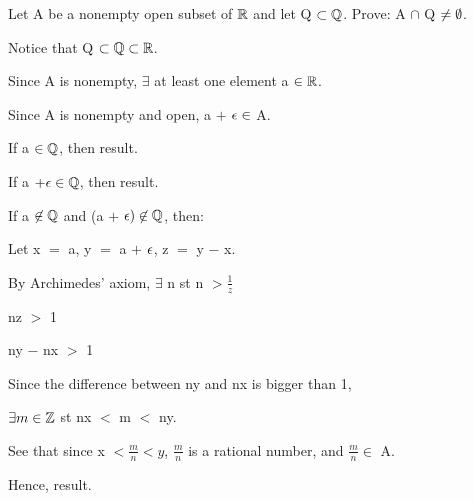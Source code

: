 \documentclass{article}
\begin{document}
\epf

\pagebreak

 Let A be a nonempty open subset of $\mathbb{R}$ and let Q $\subset \mathbb{Q}$. Prove: A $\cap$ Q $\neq \emptyset$.

\bgpf
Notice that Q $\subset \mathbb{Q} \subset \mathbb{R}$. \

Since A is nonempty, $\exists$ at least one element a $\in \mathbb{R}$. \

Since A is nonempty and open, a $+$ $\epsilon \in$ A. \

If a $\in \mathbb{Q}$, then result. \

If a $+ \epsilon \in \mathbb{Q}$, then result. \

If a $\not\in \mathbb{Q}$ and (a $+$ $\epsilon) \not\in \mathbb{Q}$, then: \

Let x $=$ a, y $=$ a $+$ $\epsilon$, z $=$ y $-$ x. \

By Archimedes' axiom, $\exists$ n st n $> \frac{1}{z	}$ \

nz $>$ 1

ny $-$ nx $>$ 1

Since the difference between ny and nx is bigger than 1, \

$\exists m \in \mathbb{Z}$ st nx $<$ m $<$ ny.

See that since  x $< \frac{m}{n	} < y$, $\frac{m}{n}$ is a rational number, and $\frac{m}{n} \in$ A. \

Hence, result. 
\epf
\end{document}
